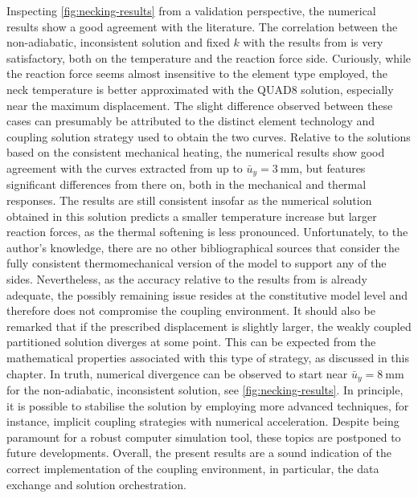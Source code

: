 Inspecting \ref{fig:necking-results} from a validation perspective, the numerical results show a good agreement with the literature.
The correlation between the non-adiabatic, inconsistent solution and fixed $k$ with the results from \cite{simo_associative_1992} is very satisfactory, both on the temperature and the reaction force side.
Curiously, while the reaction force seems almost insensitive to the element type employed, the neck temperature is better approximated with the QUAD8 solution, especially near the maximum displacement.
The slight difference observed between these cases can presumably be attributed to the distinct element technology and coupling solution strategy used to obtain the two curves.
Relative to the solutions based on the consistent mechanical heating, the numerical results show good agreement with the curves extracted from \cite{danowski_computational_2014} up to $\bar{u}_{y}=\SI{3}{\milli\meter}$, but features significant differences from there on, both in the mechanical and thermal responses.
The results are still consistent insofar as the numerical solution obtained in this solution predicts a smaller temperature increase but larger reaction forces, as the thermal softening is less pronounced.
Unfortunately, to the author's knowledge, there are no other bibliographical sources that consider the fully consistent thermomechanical version of the model to support any of the sides.
Nevertheless, as the accuracy relative to the results from \cite{simo_associative_1992} is already adequate, the possibly remaining issue resides at the constitutive model level and therefore does not compromise the coupling environment.
It should also be remarked that if the prescribed displacement is slightly larger, the weakly coupled partitioned solution diverges at some point.
This can be expected from the mathematical properties associated with this type of strategy, as discussed in this chapter.
In truth, numerical divergence can be observed to start near $\bar{u}_{y}=\SI{8}{\milli\meter}$ for the non-adiabatic, inconsistent solution, see \ref{fig:necking-results}.
In principle, it is possible to stabilise the solution by employing more advanced techniques, for instance, implicit coupling strategies with numerical acceleration.
Despite being paramount for a robust computer simulation tool, these topics are postponed to future developments.
Overall, the present results are a sound indication of the correct implementation of the coupling environment, in particular, the data exchange and solution orchestration.
\begin{figure}
\end{figure}

